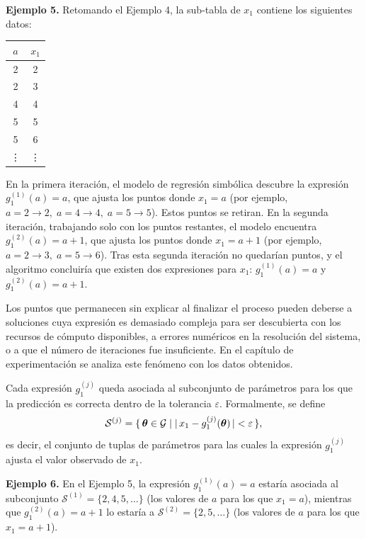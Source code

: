 \bigskip \noindent\textbf{Ejemplo 5.} Retomando el Ejemplo 4, la sub-tabla de \(x_1\) contiene los siguientes datos:

\begin{center} \begin{tabular}{c|c}
\(a\) & \(x_1\) \\
\hline
2 & 2 \\
2 & 3 \\
4 & 4 \\
5 & 5 \\
5 & 6 \\
\vdots & \vdots \end{tabular} \end{center}

En la primera iteración, el modelo de regresión simbólica descubre la expresión \(g_1^{(1)}(a) = a\), que ajusta los puntos donde \(x_1 = a\) (por ejemplo, \(a = 2 \to 2,\; a = 4 \to 4,\; a = 5 \to 5\)). Estos puntos se retiran. En la segunda iteración, trabajando solo con los puntos restantes, el modelo encuentra \(g_1^{(2)}(a) = a + 1\), que ajusta los puntos donde \(x_1 = a + 1\) (por ejemplo, \(a = 2 \to 3,\; a = 5 \to 6\)). Tras esta segunda iteración no quedarían puntos, y el algoritmo concluiría que existen dos expresiones para \(x_1\): \(g_1^{(1)}(a) = a\) y \(g_1^{(2)}(a) = a + 1\).

Los puntos que permanecen sin explicar al finalizar el proceso pueden deberse a soluciones cuya expresión es demasiado compleja para ser descubierta con los recursos de cómputo disponibles, a errores numéricos en la resolución del sistema, o a que el número de iteraciones fue insuficiente. En el capítulo de experimentación se analiza este fenómeno con los datos obtenidos.

Cada expresión \(g_1^{(j)}\) queda asociada al subconjunto de parámetros para los que la predicción es correcta dentro de la tolerancia \(\varepsilon\). Formalmente, se define \[ \mathcal{S}^{(j)} = \{\,\boldsymbol{\theta} \in \mathcal{G} \mid |\,x_1 - g_1^{(j)}(\boldsymbol{\theta})\,| < \varepsilon \,\}, \] es decir, el conjunto de tuplas de parámetros para las cuales la expresión \(g_1^{(j)}\) ajusta el valor observado de \(x_1\).

\bigskip \noindent\textbf{Ejemplo 6.} En el Ejemplo 5, la expresión \(g_1^{(1)}(a) = a\) estaría asociada al subconjunto \(\mathcal{S}^{(1)} = \{2, 4, 5, \dots\}\) (los valores de \(a\) para los que \(x_1 = a\)), mientras que \(g_1^{(2)}(a) = a + 1\) lo estaría a \(\mathcal{S}^{(2)} = \{2, 5, \dots\}\) (los valores de \(a\) para los que \(x_1 = a + 1\)).

